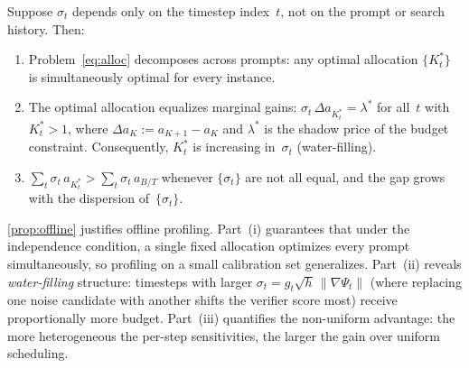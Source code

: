\begin{proposition}
\label{prop:offline}
Suppose $\sigma_t$ depends only on the timestep index~$t$, not on the
prompt or search history.
Then:
\begin{enumerate}
\item[\textbf{(i)}]
  Problem~\eqref{eq:alloc} decomposes across prompts: any optimal
  allocation $\{K_t^*\}$ is simultaneously optimal for every instance.
\item[\textbf{(ii)}]
  The optimal allocation equalizes marginal gains:
  $\sigma_t\,\Delta a_{K_t^*} = \lambda^*$ for all~$t$ with $K_t^* > 1$,
  where $\Delta a_K := a_{K+1}-a_K$ and $\lambda^*$ is the shadow price of
  the budget constraint.
  Consequently, $K_t^*$ is increasing in~$\sigma_t$ (water-filling).
\item[\textbf{(iii)}]
  $\sum_t \sigma_t\,a_{K_t^*} > \sum_t \sigma_t\,a_{B/T}$ whenever
  $\{\sigma_t\}$ are not all equal, and the gap grows with the
  dispersion of~$\{\sigma_t\}$.
\end{enumerate}
\end{proposition}

\begin{remark}
\cref{prop:offline} justifies offline profiling.
Part~(i) guarantees that under the independence condition, a single fixed
allocation optimizes every prompt simultaneously, so profiling on a small calibration
set generalizes.
Part~(ii) reveals \emph{water-filling} structure: timesteps with larger
$\sigma_t = g_t\sqrt{h}\,\|\nabla\Psi_t\|$ (where replacing one noise
candidate with another shifts the verifier score most) receive
proportionally more budget.
Part~(iii) quantifies the non-uniform advantage: the more
heterogeneous the per-step sensitivities, the larger the gain
over uniform scheduling.
\end{remark}

